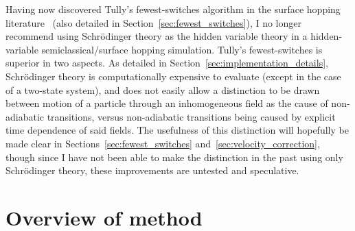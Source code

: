 Having now discovered Tully's fewest-switches algorithm in the surface hopping literature~\cite{doi:10.1063/1.459170, doi:10.1146/annurev-physchem-040215-112245, doi:10.1063/1.2715585} (also detailed in Section~\ref{sec:fewest_switches}), I no longer recommend using Schr\"odinger theory as the hidden variable theory in a hidden-variable semiclassical/surface hopping simulation. Tully's fewest-switches is superior in two aspects. As detailed in Section~\ref{sec:implementation_details}, Schr\"odinger theory is computationally expensive to evaluate (except in the case of a two-state system), and does not easily allow a distinction to be drawn between motion of a particle through an inhomogeneous field as the cause of non-adiabatic transitions, versus non-adiabatic transitions being caused by explicit time dependence of said fields. The usefulness of this distinction will hopefully be made clear in Sections~\ref{sec:fewest_switches} and~\ref{sec:velocity_correction}, though since I have not been able to make the distinction in the past using only Schr\"odinger theory, these improvements are untested and speculative.

\section{Overview of method}\label{sec:overview_of_method}


